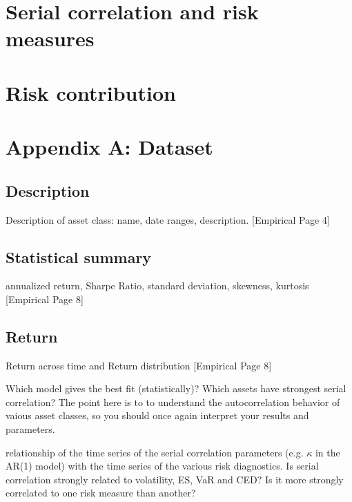 \documentclass[11pt]{article}
\begin{document}
\section{Serial correlation and risk measures}


\section{Risk contribution}






\newpage
\appendix
\section{Appendix A: Dataset} \label{App:AppendixA}
\subsection{Description}
Description of asset class: name, date ranges, description. [Empirical Page 4]

\subsection{Statistical summary}
annualized return, Sharpe Ratio, standard deviation, skewness, kurtosis [Empirical Page 8]

\subsection{Return}
Return across time and Return distribution [Empirical Page 8]

\newpage









\clearpage


Which model gives the best fit (statistically)? Which assets have strongest serial correlation? The point here is to to understand the autocorrelation behavior of vaious asset classes, so you should once again interpret your results and parameters.


relationship of the time series of the serial correlation parameters (e.g. $\kappa$ in the AR(1) model) with the time series of the various risk diagnostics. Is serial correlation strongly related to volatility, ES, VaR and CED? Is it more strongly correlated to one risk measure than another?
\end{document}
